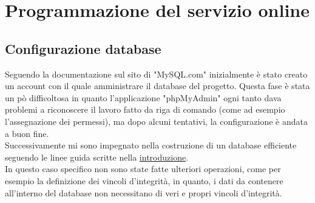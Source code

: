 \chapter{Programmazione del servizio online}\label{cap:Programmazione del servizio online}

\section{Configurazione database}\label{sez:Configurazione database}

Seguendo la documentazione sul sito di "MySQL.com" inizialmente è stato creato un account con il quale amministrare il database del progetto. Questa fase è stata un pò difficoltosa in quanto l'applicazione "phpMyAdmin" ogni tanto dava  problemi a riconoscere il lavoro fatto da riga di comando (come ad esempio l'assegnazione dei permessi), ma dopo alcuni tentativi, la configurazione è andata a buon fine.\\
Successivamente mi sono impegnato nella costruzione di un database efficiente seguendo le linee guida scritte nella \hyperref[cap:Introduzione]{introduzione}.\\
In questo caso specifico non sono state fatte ulteriori operazioni, come per esempio la definizione dei vincoli d'integrità, in quanto, i dati da contenere all'interno del database non necessitano di veri e propri vincoli d'integrità.\\

